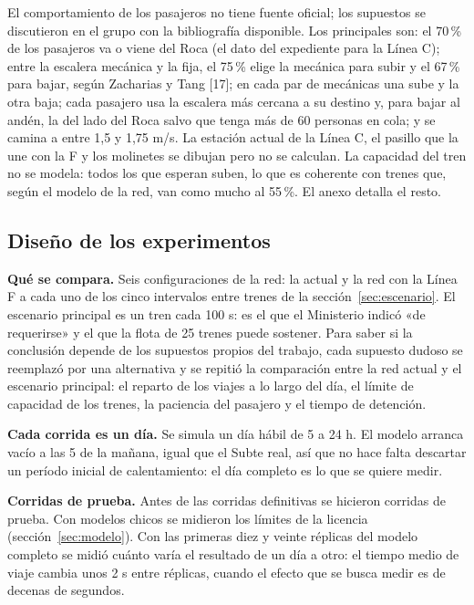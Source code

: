 \documentclass{article}
\begin{document}
El comportamiento de los pasajeros no tiene fuente oficial; los supuestos se discutieron en el grupo con la
bibliografía disponible. Los principales son: el 70\,\% de los pasajeros va o viene del Roca (el dato del
expediente para la Línea C); entre la escalera mecánica y la fija, el 75\,\% elige la mecánica para subir y
el 67\,\% para bajar, según Zacharias y Tang [17]; en cada par de mecánicas una sube y la otra baja; cada
pasajero usa la escalera más cercana a su destino y, para bajar al andén, la del lado del Roca salvo que
tenga más de 60 personas en cola; y se camina a entre 1,5 y 1,75 m/s. La estación actual de la Línea C, el
pasillo que la une con la F y los molinetes se dibujan pero no se calculan. La capacidad del tren no se
modela: todos los que esperan suben, lo que es coherente con trenes que, según el modelo de la red, van como
mucho al 55\,\%. El anexo detalla el resto.

\subsection{Diseño de los experimentos}
\label{sec:diseno}

\textbf{Qué se compara.} Seis configuraciones de la red: la actual y la red con la Línea F a cada uno de los
cinco intervalos entre trenes de la sección~\ref{sec:escenario}. El escenario principal es un tren cada
100 s: es el que el Ministerio indicó «de requerirse» y el que la flota de 25 trenes puede sostener. Para
saber si la conclusión depende de los supuestos propios del trabajo, cada supuesto dudoso se reemplazó por una
alternativa y se repitió la comparación entre la red actual y el escenario principal: el reparto de los viajes
a lo largo del día, el límite de capacidad de los trenes, la paciencia del pasajero y el tiempo de detención.

\textbf{Cada corrida es un día.} Se simula un día hábil de 5 a 24 h. El modelo arranca vacío a las 5 de la
mañana, igual que el Subte real, así que no hace falta descartar un período inicial de calentamiento: el
día completo es lo que se quiere medir.

\textbf{Corridas de prueba.} Antes de las corridas definitivas se hicieron corridas de prueba. Con modelos
chicos se midieron los límites de la licencia (sección~\ref{sec:modelo}). Con las primeras diez y veinte
réplicas del modelo completo se midió cuánto varía el resultado de un día a otro: el tiempo medio de viaje
cambia unos 2 s entre réplicas, cuando el efecto que se busca medir es de decenas de segundos.
\end{document}
